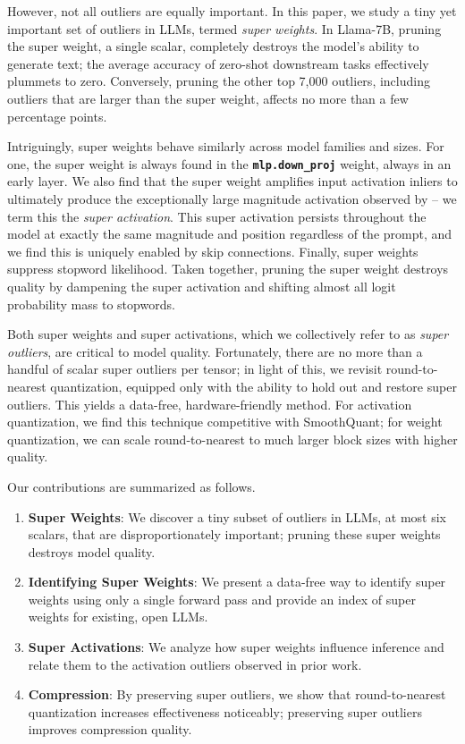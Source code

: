 \documentclass{article} %
\begin{document}
However, not all outliers are equally important. 
In this paper, we study a tiny yet important set of outliers in LLMs, termed \emph{super weights}. In Llama-7B, pruning the super weight, a single scalar, completely destroys the model's ability to generate text; the average accuracy of zero-shot downstream tasks effectively plummets to zero. Conversely, pruning the other top 7,000 outliers, including outliers that are larger than the super weight, affects no more than a few percentage points.

Intriguingly, super weights behave similarly across model families and sizes. For one, the super weight is always found in the \textbf{\texttt{mlp.down\_proj}} weight, always in an early layer. We also find that the super weight amplifies input activation inliers to ultimately produce the exceptionally large magnitude activation observed by \citet{sun2024massive} -- we term this the \textit{super activation}. This super activation persists throughout the model at exactly the same magnitude and position regardless of the prompt, and we find this is uniquely enabled by skip connections. Finally, super weights suppress stopword likelihood. Taken together, pruning the super weight destroys quality by dampening the super activation and shifting almost all logit probability mass to stopwords.

Both super weights and super activations, which we collectively refer to as \textit{super outliers}, are critical to model quality. Fortunately, there are no more than a handful of scalar super outliers per tensor; in light of this, we revisit round-to-nearest quantization, equipped only with the ability to hold out and restore super outliers. This yields a data-free, hardware-friendly method. For activation quantization, we find this technique competitive with SmoothQuant; for weight quantization, we can scale round-to-nearest to much larger block sizes with higher quality.

Our contributions are summarized as follows.
\begin{enumerate}
    \item \textbf{Super Weights}: We discover a tiny subset of outliers in LLMs, at most six scalars, that are disproportionately important; pruning these super weights destroys model quality.
    \item \textbf{Identifying Super Weights}: We present a data-free way to identify super weights using only a single forward pass and provide an index of super weights for existing, open LLMs.
    \item \textbf{Super Activations}: We analyze how super weights influence inference and relate them to the activation outliers observed in prior work. 
    \item \textbf{Compression}: By preserving super outliers, we show that round-to-nearest quantization increases effectiveness noticeably; preserving super outliers improves compression quality.
\end{enumerate}
\end{document}
